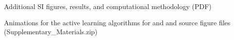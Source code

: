 Additional SI figures, \IrOtwo results, and computational methodology (PDF)

Animations for the active learning algorithms for \IrOtwo and \IrOthree and source figure files (Supplementary\_Materials.zip)


\begin{acknowledgement}

\end{acknowledgement}


%
% 





